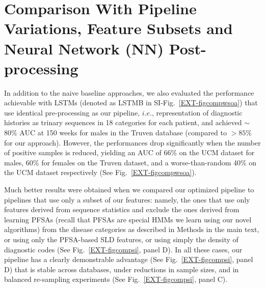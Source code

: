 \documentclass[onecolumn,,10pt]{IEEEtran}
\begin{document}
\section{Comparison With  Pipeline Variations, Feature Subsets and Neural Network (NN) Post-processing}\label{sec:pipelinevar}
In addition to the naive baseline approaches, we also evaluated the performance achievable  with LSTMs (denoted as LSTMB in SI-Fig.~\ref{EXT-figcompwsoa}) that use identical pre-processing as our pipeline, $i.e.$, representation of diagnostic histories as trinary sequences in 18 categories for each patient, and achieved $\sim$80\% AUC  at 150 weeks for males in the Truven database (compared to $> 85\%$ for our approach). However, the performances drop significantly when the number of positive samples is reduced, yielding an AUC of 66\% on the UCM dataset for males, 60\% for females on the Truven dataset, and a  worse-than-random 40\% on the UCM dataset respectively (See Fig.~\ref{EXT-figcompwsoa}). 

  Much better results were obtained when we compared our optimized pipeline to pipelines that use only a subset of our features: namely, the  ones that use only features derived from sequence statistics and exclude the ones derived from learning PFSAs (recall that PFSAs are special HMMs we learn using our novel algorithms)  from the disease categories as described in Methods in the main text, or using only the PFSA-based SLD features, or using simply the density of diagnostic codes (See Fig.~\ref{EXT-figcompsi}, panel D). In all these cases, our pipeline has a clearly demonstrable advantage (See  Fig.~\ref{EXT-figcompsi}, panel D) that is stable across databases,  under reductions in sample sizes, and in balanced re-sampling experiments (See Fig.~\ref{EXT-figcompsi}, panel C).
  
\end{document}
